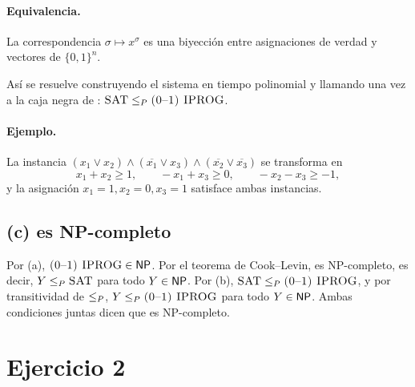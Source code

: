 \paragraph{Equivalencia.} La correspondencia $\sigma\mapsto x^\sigma$ es una biyección entre asignaciones de
verdad y vectores de $\{0,1\}^n$.
Así \SAT{} se resuelve construyendo el sistema en tiempo polinomial y llamando una vez a la caja negra de
\IPROG: $\textsc{SAT}\le_P\textsc{(0--1) IPROG}$.

\paragraph{Ejemplo.} La instancia $(x_1\vee x_2)\wedge(\overline{x_1}\vee x_3)\wedge(\overline{x_2}\vee\overline{x_3})$
se transforma en
\[
  x_1+x_2\ge1,\qquad -x_1+x_3\ge 0,\qquad -x_2-x_3\ge -1,
\]
y la asignación $x_1=1,x_2=0,x_3=1$ satisface ambas instancias.

\subsection*{(c) \IPROG{} es NP-completo}

Por (a), $\textsc{(0--1) IPROG}\in\mathsf{NP}$. Por el teorema de Cook--Levin, \SAT{} es NP-completo, es decir, $Y\le_P\textsc{SAT}$ para todo
$Y\in\mathsf{NP}$. Por (b), $\textsc{SAT}\le_P\textsc{(0--1) IPROG}$, y por transitividad de $\le_P$, $Y\le_P\textsc{(0--1) IPROG}$ para todo $Y\in\mathsf{NP}$. Ambas
condiciones juntas dicen que \IPROG{} es NP-completo.

\section{Ejercicio 2}

